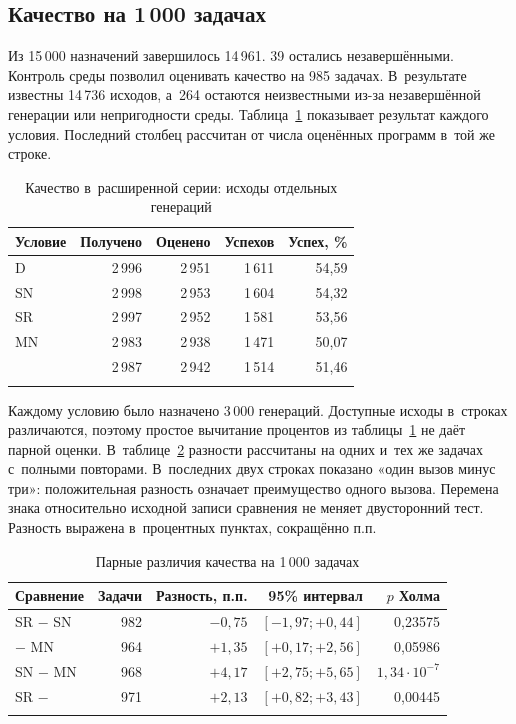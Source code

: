 \subsection{Качество на 1\,000 задачах}\label{subsec:scale}
Из 15\,000 назначений завершилось 14\,961. 39 остались незавершёнными. Контроль среды позволил оценивать качество на 985 задачах. В~результате известны 14\,736 исходов, а~264 остаются неизвестными из-за незавершённой генерации или непригодности среды. Таблица~\ref{tab:scale-quality} показывает результат каждого условия. Последний столбец рассчитан от числа оценённых программ в~той же строке.

\begin{table}[htbp]
\caption{Качество в~расширенной серии: исходы отдельных генераций}
\label{tab:scale-quality}
\centering\small\renewcommand{\arraystretch}{1.15}
\begin{tabular}{@{}lrrrr@{}}
\toprule
Условие & Получено & Оценено & Успехов & Успех, \% \\
\midrule
D & 2\,996 & 2\,951 & 1\,611 & 54,59 \\
SN & 2\,998 & 2\,953 & 1\,604 & 54,32 \\
SR & 2\,997 & 2\,952 & 1\,581 & 53,56 \\
MN & 2\,983 & 2\,938 & 1\,471 & 50,07 \\
\MultiCallRole{} & 2\,987 & 2\,942 & 1\,514 & 51,46 \\
\botrule
\end{tabular}
\end{table}
\FloatBarrier

Каждому условию было назначено 3\,000 генераций. Доступные исходы в~строках различаются, поэтому простое вычитание процентов из таблицы~\ref{tab:scale-quality} не даёт парной оценки. В~таблице~\ref{tab:scale-contrasts} разности рассчитаны на одних и~тех же задачах с~полными повторами. В~последних двух строках показано «один вызов минус три»: положительная разность означает преимущество одного вызова. Перемена знака относительно исходной записи сравнения не меняет двусторонний тест. Разность выражена в~процентных пунктах, сокращённо п.п.

\begin{table}[htbp]
\caption{Парные различия качества на 1\,000 задачах}
\label{tab:scale-contrasts}
\centering\small\renewcommand{\arraystretch}{1.2}
\begin{tabular}{@{}lrrrr@{}}
\toprule
Сравнение & Задачи & Разность, п.п. & 95\% интервал & $p$ Холма \\
\midrule
SR $-$ SN & 982 & $-0{,}75$ & $[-1{,}97;+0{,}44]$ & 0,23575 \\
\MultiCallRole{} $-$ MN & 964 & $+1{,}35$ & $[+0{,}17;+2{,}56]$ & 0,05986 \\
SN $-$ MN & 968 & $+4{,}17$ & $[+2{,}75;+5{,}65]$ & $1{,}34\cdot10^{-7}$ \\
SR $-$ \MultiCallRole{} & 971 & $+2{,}13$ & $[+0{,}82;+3{,}43]$ & 0,00445 \\
\botrule
\end{tabular}
\end{table}
\FloatBarrier

